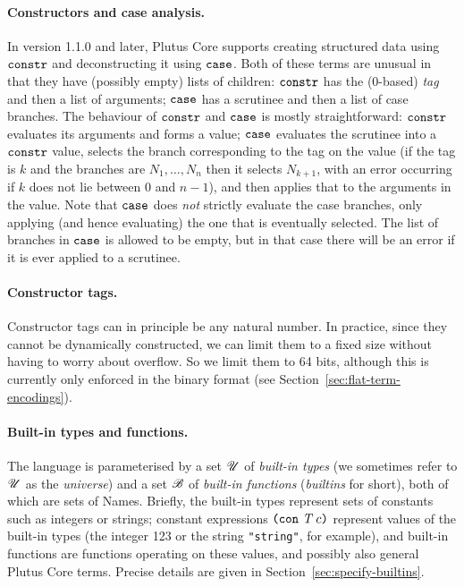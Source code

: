 \paragraph{Constructors and case analysis.}
In version 1.1.0 and later, Plutus Core supports creating structured data using
$\texttt{constr}$ and deconstructing it using $\texttt{case}$. Both of these
terms are unusual in that they have (possibly empty) lists of children:
$\texttt{constr}$ has the (0-based) \emph{tag} and then a list of arguments;
$\texttt{case}$ has a scrutinee and then a list of case branches. The behaviour
of $\texttt{constr}$ and $\texttt{case}$ is mostly straightforward:
$\texttt{constr}$ evaluates its arguments and forms a value; $\texttt{case}$
evaluates the scrutinee into a $\texttt{constr}$ value, selects the branch
corresponding to the tag on the value (if the tag is $k$ and the branches are
$N_1, \ldots, N_n$ then it selects $N_{k+1}$, with an error occurring if $k$
does not lie between 0 and $n-1$), and then applies that to the arguments in the
value. Note that $\texttt{case}$ does \emph{not} strictly evaluate the case
branches, only applying (and hence evaluating) the one that is eventually
selected.  The list of branches in $\texttt{case}$ is allowed to be empty, but
in that case there will be an error if it is ever applied to a scrutinee.

\paragraph{Constructor tags.}
Constructor tags can in principle be any natural number. In practice, since they
cannot be dynamically constructed, we can limit them to a fixed size without
having to worry about overflow. So we limit them to 64 bits, although this is
currently only enforced in the binary format (see
Section~\ref{sec:flat-term-encodings}).

\paragraph{Built-in types and functions.} The language is parameterised by a set $\mathscr{U}$ of
\textit{built-in types} (we sometimes refer to $\mathscr{U}$ as the \textit{universe})
and a set $\mathscr{B}$ of \textit{built-in functions} (\textit{builtins} for short),
both of which are sets of Names.  Briefly, the built-in types represent sets of
constants such as integers or strings; constant expressions $\texttt{(} \texttt{con} ~ \textit{T} ~ c \texttt{)}$
represent values of the built-in types (the integer 123 or the string
\texttt{"string"}, for example), and built-in functions are functions operating
on these values, and possibly also general Plutus Core terms.  Precise details
are given in Section~\ref{sec:specify-builtins}.

